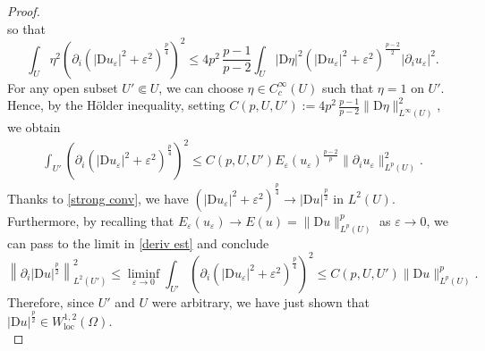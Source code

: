 \documentclass[a4paper,11pt]{article}
\numberwithin{equation}{section}
\newcommand{\eps}{\varepsilon}
\newcommand{\Om}{\Omega}
\newcommand{\rom}{\mathrm}
\theoremstyle{definition}
\begin{document}
\begin{proof}
$$$$
so that
$$
\int_U\eta^2\left(\partial_i \left(|\rom Du_\eps|^2+\eps^2\right)^{\frac p4}\right)^2\leq4p^2\,\frac{p-1}{p-2}\int_U|\rom D\eta|^2\left(|\rom Du_\eps|^2+\eps^2\right)^{\frac{p-2}2}|\partial_iu_\eps|^2.
$$
For any open subset $U'\Subset U$, we can choose $\eta\in C^\infty_c(U)$ such that $\eta=1$ on $U'$. Hence, by the H\"older inequality, setting $C(p,U,U'):=4p^2\,\frac{p-1}{p-2}\|\rom D\eta\|^2_{L^\infty(U)}$, we obtain
\begin{align}\label{deriv est}
\int_{U'}\left(\partial_i \left(|\rom Du_\eps|^2+\eps^2\right)^{\frac p4}\right)^2\leq C(p,U,U')E_\eps(u_\eps)^\frac{p-2}{p}\|\partial_iu_\eps\|^2_{L^p(U)}.
\end{align}
Thanks to \eqref{strong conv}, we have $\left(|\rom Du_\eps|^2+\eps^2\right)^{\frac p4}\to |\rom Du|^{\frac{p}{2}}$ in $L^2(U)$. Furthermore, by recalling that $E_\eps(u_\eps)\to E(u)=\|\rom Du\|^p_{L^p(U)}$ as $\eps\to0$, we can pass to the limit in \eqref{deriv est} and conclude
$$
\left\|\partial_i|\rom Du|^\frac p2\right\|^2_{L^2(U')}\leq\liminf_{\eps\to0}\int_{U'}\left(\partial_i \left(|\rom Du_\eps|^2+\eps^2\right)^{\frac p4}\right)^2\leq C(p,U,U')\|\rom Du\|^{p}_{L^p(U)}.
$$
Therefore, since $U'$ and $U$ were arbitrary, we have just shown that $|\rom Du|^\frac p2\in W^{1,2}_\mathrm{loc}(\Om)$.\\
\end{proof}
\end{document}
